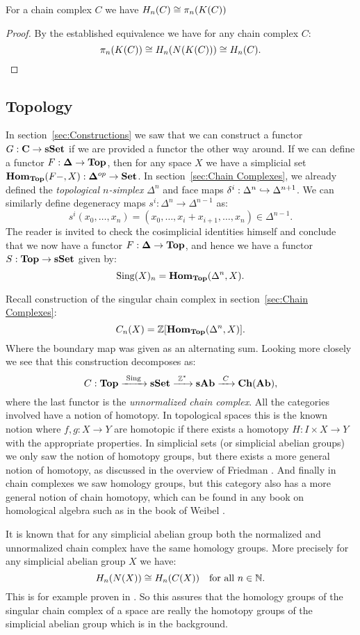 \begin{corollary}
	For a chain complex $C$ we have $H_n(C) \cong \pi_n(K(C))$
\end{corollary}
\begin{proof}
	By the established equivalence we have for any chain complex $C$:
	$$ \pi_n(K(C)) \cong H_n(N(K(C))) \cong H_n(C). $$
\end{proof}

\subsection{Topology}
In section~\ref{sec:Constructions} we saw that we can construct a functor $G: \mathbf{C} \to \mathbf{sSet}$ if we are provided a functor the other way around. If we can define a functor $F: \mathbf{\Delta} \to \mathbf{Top}$, then for any space $X$ we have a simplicial set $\mathbf{Hom}_{\mathbf{Top}}(F-, X): \mathbf{\Delta}^{op} \to \mathbf{Set}$. In section~\ref{sec:Chain Complexes}, we already defined the \emph{topological $n$-simplex} $\Delta^n$ and face maps $\delta^i : \Delta^n \hookrightarrow \Delta^{n+1}$. We can similarly define degeneracy maps $s^i: \Delta^n \to \Delta^{n-1}$ as:
$$ s^i(x_0, \ldots, x_n) = (x_0, \ldots, x_i + x_{i+1}, \ldots, x_n) \in \Delta^{n-1}. $$
The reader is invited to check the cosimplicial identities himself and conclude that we now have a functor $F: \mathbf{\Delta} \to \mathbf{Top}$, and hence we have a functor $S: \mathbf{Top} \to \mathbf{sSet}$ given by:
$$ \text{Sing}(X)_n = \mathbf{Hom}_{\mathbf{Top}}(\Delta^n, X). $$

Recall construction of the singular chain complex in section~\ref{sec:Chain Complexes}:
$$ C_n(X) = \mathbb{Z}[\mathbf{Hom}_{\mathbf{Top}}(\Delta^n, X)]. $$
Where the boundary map was given as an alternating sum. Looking more closely we see that this construction decomposes as:
$$ C: \mathbf{Top} \xrightarrow{\,\,{\text{Sing}}\,\,} \mathbf{sSet} \xrightarrow{\,\,{\mathbb{Z}^\ast}\,\,} \mathbf{sAb} \xrightarrow{\,\,{C}\,\,} \mathbf{Ch}(\mathbf{Ab}), $$
where the last functor is the \emph{unnormalized chain complex}. All the categories involved have a notion of homotopy. In topological spaces this is the known notion where $f, g:X \to Y$ are homotopic if there exists a homotopy $H:I \times X \to Y$ with the appropriate properties. In simplicial sets (or simplicial abelian groups) we only saw the notion of homotopy groups, but there exists a more general notion of homotopy, as discussed in the overview of Friedman \cite{friedman}. And finally in chain complexes we saw homology groups, but this category also has a more general notion of chain homotopy, which can be found in any book on homological algebra such as in the book of Weibel \cite{weibel}.

It is known that for any simplicial abelian group both the normalized and unnormalized chain complex have the same homology groups. More precisely for any simplicial abelian group $X$ we have:
$$ H_n(N(X)) \cong H_n(C(X)) \quad\text{for all } n \in \mathbb{N}. $$
This is for example proven in \cite[Theorem 4.1]{eilenberg}. So this assures that the homology groups of the singular chain complex of a space are really the homotopy groups of the simplicial abelian group which is in the background.
